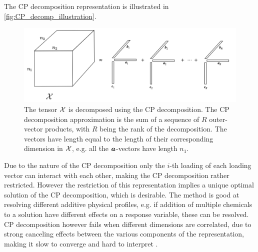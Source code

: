 The CP decomposition representation is illustrated in \autoref{fig:CP_decomp_illustration}.
\begin{figure}
    \centering
    \captionsetup{width=.95\linewidth}
    \includegraphics[width=\linewidth]{Pics/02_Theory/CP_decomp_illustration.png}
    \caption{The tensor $\mathcal{X}$ is decomposed using the CP decomposition. The CP decomposition approximation is the sum of a sequence of $R$ outer-vector products, with $R$ being the rank of the decomposition. The vectors have length equal to the length of their corresponding dimension in $\mathcal{X}$, e.g. all the $\boldsymbol{a}$-vectors have length $n_1$.}
    \label{fig:CP_decomp_illustration}
\end{figure}

Due to the nature of the CP decomposition only the $i$-th loading of each loading vector can interact with each other, making the CP decomposition rather restricted. However the restriction of this representation implies a unique optimal solution of the CP decomposition, which is desirable. The method is good at resolving different additive physical profiles, e.g. if addition of multiple chemicals to a solution have different effects on a response variable, these can be resolved. CP decomposition however fails when different dimensions are correlated, due to strong canceling effects between the various components of the representation, making it slow to converge and hard to interpret \cite{Mørup2011}.

